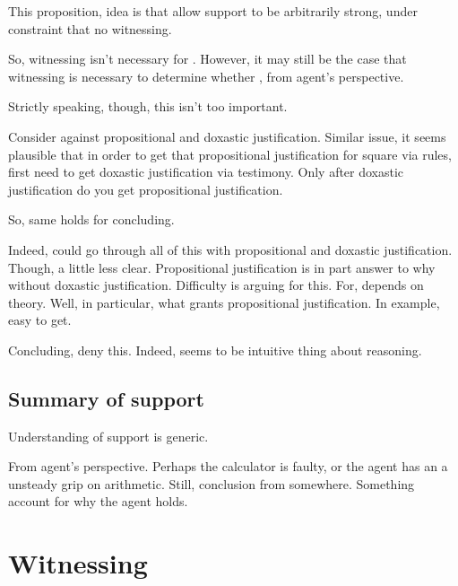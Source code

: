 \begin{note}
  This proposition, idea is that allow support to be arbitrarily strong, under constraint that no witnessing.

  So, witnessing isn't necessary for \support{}.
  However, it may still be the case that witnessing is necessary to determine whether \support{}, from agent's perspective.

  Strictly speaking, though, this isn't too important.

  Consider against propositional and doxastic justification.
  Similar issue, it seems plausible that in order to get that propositional justification for square via rules, first need to get doxastic justification via testimony.
  Only after doxastic justification do you get propositional justification.

  So, same holds for concluding.

  Indeed, could go through all of this with propositional and doxastic justification.
  Though, a little less clear.
  Propositional justification is in part answer to why without doxastic justification.
  Difficulty is arguing for this.
  For, depends on theory.
  Well, in particular, what grants propositional justification.
  In example, easy to get.

  Concluding, deny this.
  Indeed, seems to be intuitive thing about reasoning.
\end{note}

\subsection{Summary of support}
\label{sec:summary-support}

\begin{note}
  Understanding of support is generic.

  From agent's perspective.
  Perhaps the calculator is faulty, or the agent has an a unsteady grip on arithmetic.
  Still, conclusion from somewhere.
  Something account for why the agent holds.
\end{note}


\section{Witnessing}
\label{sec:reasoning}

